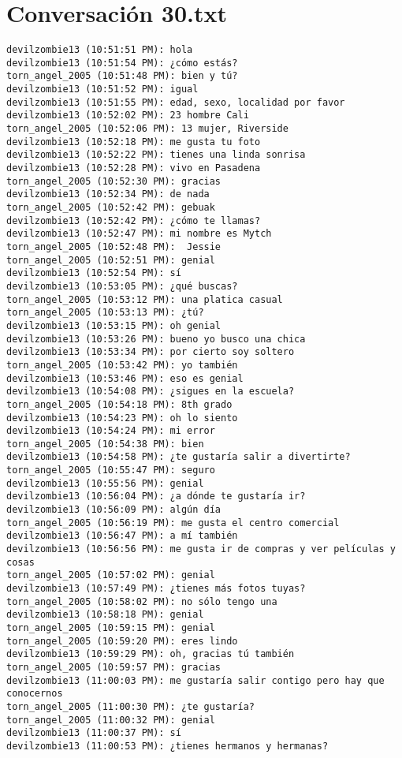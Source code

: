 \section{Conversaci\'on 30.txt}

\begin{verbatim}
devilzombie13 (10:51:51 PM): hola
devilzombie13 (10:51:54 PM): ¿cómo estás?
torn_angel_2005 (10:51:48 PM): bien y tú?
devilzombie13 (10:51:52 PM): igual
devilzombie13 (10:51:55 PM): edad, sexo, localidad por favor
devilzombie13 (10:52:02 PM): 23 hombre Cali
torn_angel_2005 (10:52:06 PM): 13 mujer, Riverside
devilzombie13 (10:52:18 PM): me gusta tu foto 
devilzombie13 (10:52:22 PM): tienes una linda sonrisa
devilzombie13 (10:52:28 PM): vivo en Pasadena
torn_angel_2005 (10:52:30 PM): gracias
devilzombie13 (10:52:34 PM): de nada
torn_angel_2005 (10:52:42 PM): gebuak
devilzombie13 (10:52:42 PM): ¿cómo te llamas?
devilzombie13 (10:52:47 PM): mi nombre es Mytch
torn_angel_2005 (10:52:48 PM):  Jessie
torn_angel_2005 (10:52:51 PM): genial
devilzombie13 (10:52:54 PM): sí
devilzombie13 (10:53:05 PM): ¿qué buscas?
torn_angel_2005 (10:53:12 PM): una platica casual
torn_angel_2005 (10:53:13 PM): ¿tú?
devilzombie13 (10:53:15 PM): oh genial 
devilzombie13 (10:53:26 PM): bueno yo busco una chica
devilzombie13 (10:53:34 PM): por cierto soy soltero 
torn_angel_2005 (10:53:42 PM): yo también
devilzombie13 (10:53:46 PM): eso es genial
devilzombie13 (10:54:08 PM): ¿sigues en la escuela?
torn_angel_2005 (10:54:18 PM): 8th grado
devilzombie13 (10:54:23 PM): oh lo siento
devilzombie13 (10:54:24 PM): mi error
torn_angel_2005 (10:54:38 PM): bien
devilzombie13 (10:54:58 PM): ¿te gustaría salir a divertirte?
torn_angel_2005 (10:55:47 PM): seguro
devilzombie13 (10:55:56 PM): genial
devilzombie13 (10:56:04 PM): ¿a dónde te gustaría ir?
devilzombie13 (10:56:09 PM): algún día
torn_angel_2005 (10:56:19 PM): me gusta el centro comercial
devilzombie13 (10:56:47 PM): a mí también
devilzombie13 (10:56:56 PM): me gusta ir de compras y ver películas y cosas
torn_angel_2005 (10:57:02 PM): genial
devilzombie13 (10:57:49 PM): ¿tienes más fotos tuyas?
torn_angel_2005 (10:58:02 PM): no sólo tengo una
devilzombie13 (10:58:18 PM): genial
torn_angel_2005 (10:59:15 PM): genial
torn_angel_2005 (10:59:20 PM): eres lindo
devilzombie13 (10:59:29 PM): oh, gracias tú también 
torn_angel_2005 (10:59:57 PM): gracias
devilzombie13 (11:00:03 PM): me gustaría salir contigo pero hay que conocernos
torn_angel_2005 (11:00:30 PM): ¿te gustaría?
torn_angel_2005 (11:00:32 PM): genial
devilzombie13 (11:00:37 PM): sí
devilzombie13 (11:00:53 PM): ¿tienes hermanos y hermanas?

\end{verbatim}

